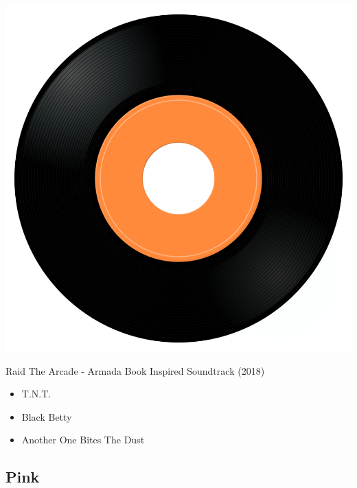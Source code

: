 \begin{minipage}[t]{0.25\textwidth}\vspace{0pt}
\captionsetup{type=figure}
\includegraphics[width=\textwidth]{Images/cover.png}
\caption*{Raid The Arcade - Armada Book Inspired Soundtrack (2018)}
\end{minipage}
\begin{minipage}[t]{0.25\textwidth}\vspace{0pt}
\begin{itemize}[nosep,leftmargin=1em,labelwidth=*,align=left]
	\setlength{\itemsep}{0pt}
	\item T.N.T.
	\item Black Betty 
	\item Another One Bites The Dust
\end{itemize}
\end{minipage}

\subsection{Pink}

